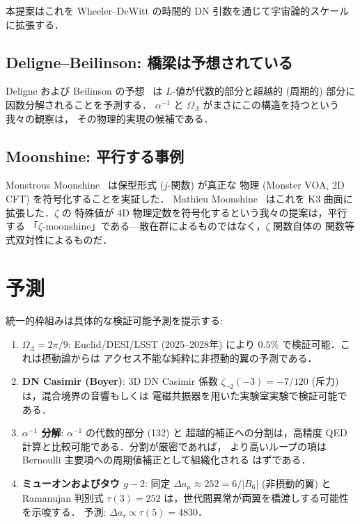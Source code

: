 \documentclass[11pt,a4paper]{article}
\begin{document}
本提案はこれを Wheeler--DeWitt の時間的 DN 引数を通じて宇宙論的スケール
に拡張する．

\subsection{Deligne--Beilinson: 橋梁は予想されている}

Deligne および Beilinson の予想~\cite{Deligne1979,Beilinson1984} は
$L$-値が代数的部分と超越的 (周期的) 部分に因数分解されることを予測する．
$\alpha^{-1}$ と $\Omega_\Lambda$ がまさにこの構造を持つという我々の観察は，
その物理的実現の候補である．

\subsection{Moonshine: 平行する事例}

Monstrous Moonshine~\cite{Borcherds1992} は保型形式 ($j$-関数) が真正な
物理 (Monster VOA, 2D CFT) を符号化することを実証した．
Mathieu Moonshine~\cite{EOT2010} はこれを K3 曲面に拡張した．$\zeta$ の
特殊値が 4D 物理定数を符号化するという我々の提案は，平行する
「$\zeta$-moonshine」である---散在群によるものではなく，$\zeta$ 関数自体の
関数等式双対性によるものだ．

\section{予測}

統一的枠組みは具体的な検証可能予測を提示する:

\begin{enumerate}
\item \textbf{$\Omega_\Lambda = 2\pi/9$}: Euclid/DESI/LSST
(2025--2028年) により $0.5\%$ で検証可能．これは摂動論からは
アクセス不能な純粋に非摂動的翼の予測である．

\item \textbf{DN Casimir (Boyer)}: 3D DN Casimir 係数
$\zeta_{\neg 2}(-3) = -7/120$ (斥力) は，混合境界の音響もしくは
電磁共振器を用いた実験室実験で検証可能である．

\item \textbf{$\alpha^{-1}$ 分解}: $\alpha^{-1}$ の代数的部分 (132) と
超越的補正への分割は，高精度 QED 計算と比較可能である．分割が厳密であれば，
より高いループの項は Bernoulli 主要項への周期値補正として組織化される
はずである．

\item \textbf{ミューオンおよびタウ $g-2$}: 同定
$\Delta a_\mu \approx 252 = 6/|B_6|$ (非摂動的翼) と Ramanujan 判別式
$\tau(3) = 252$ は，世代間異常が両翼を橋渡しする可能性を示唆する．
予測: $\Delta a_\tau \propto \tau(5) = 4830$．
\end{enumerate}
\end{document}
